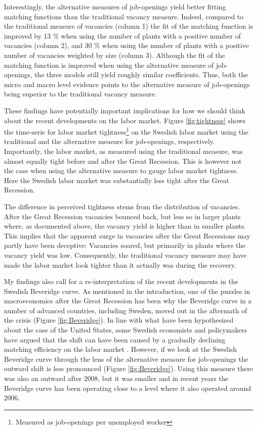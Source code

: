 Interestingly, the alternative measures of job-openings yield better fitting matching functions than the traditional vacancy measure. Indeed, compared to the traditional measure of vacancies (column 1) the fit of the matching function is improved by 13 \% when using the number of plants with a positive number of vacancies (column 2), and 30 \% when using the number of plants with a positive number of vacancies weighted by size (column 3). Although the fit of the matching function is improved when using the alternative measure of job-openings, the three models still yield roughly similar coefficients. Thus, both the micro and macro level evidence points to the alternative measure of job-openings being superior to the traditional vacancy measure. 



These findings have potentially important implications for how we should think about the recent developments on the labor market. Figure \ref{fig:tightness} shows the time-serie for labor market tightness\footnote{Measured as job-openings per unemployed worker} on the Swedish labor market using the traditional and the alternative measure for job-openings, respectively. Importantly, the labor market, as measured using the traditional measure, was almost equally tight before and after the Great Recession. This is however not the case when using the alternative measure to gauge labor market tightness. Here the Swedish labor market was substantially less tight after the Great Recession. 

The difference in perceived tightness stems from the distribution of vacancies. After the Great Recession vacancies bounced back, but less so in larger plants where, as documented above, the vacancy yield is higher than in smaller plants. This implies that the apparent surge in vacancies after the Great Recessions may partly have been deceptive: Vacancies soared, but primarily in plants where the vacancy yield was low. Consequently, the traditional vacancy measure may have made the labor market look tighter than it actually was during the recovery. 

My findings also call for a re-interpretation of the recent developments in the Swedish Beveridge curve. As mentioned in the introduction, one of the puzzles in macroeconomics after the Great Recession has been why the Beveridge curve in a number of advanced countries, including Sweden, moved out in the aftermath of the crisis (Figure \ref{fig:Beveridge}). In line with what have been hypothesized about the case of the United States, some Swedish economists and policymakers have argued that the shift can have been caused by a gradually declining matching efficiency on the labor market \citep{Riksbank2012, Hakanson2014}. However, if we look at the Swedish Beveridge curve through the lens of the alternative measure for job-openings the outward shift is less pronounced (Figure \ref{fig:Beveridge}). Using this measure there was also an outward after 2008, but it was smaller and in recent years the Beveridge curve has been operating close to a level where it also operated around 2006. 

